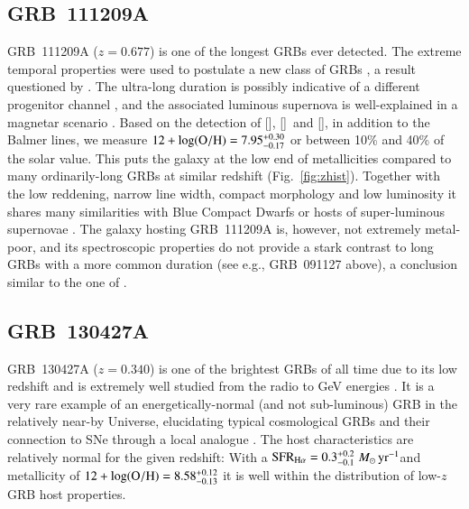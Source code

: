 \documentclass[traditabstract, longauth]{aa}
\newcommand{\oh}{12+\log(\rm{O/H})}
\newcommand{\oii}{[\ion{O}{ii}]}
\newcommand{\oiii}{[\ion{O}{iii}]}
\newcommand{\neiii}{[\ion{Ne}{iii}]}
\newcommand{\Msunyr}{$M_\odot\,\rm{yr}^{-1}$}
\begin{document}
\begin{appendix}
\subsection{GRB~111209A} GRB~111209A ($z=0.677$) is one of the longest GRBs ever detected. The extreme temporal properties were used to postulate a new class of GRBs \citep{2013ApJ...766...30G, 2014ApJ...781...13L}, a result questioned by \citet{2013ApJ...778...54V}. The ultra-long duration is possibly indicative of a different progenitor channel \citep{2013ApJ...778...67N}, and the associated luminous supernova is well-explained in a magnetar scenario \citep{2015Kannsubm, 2015Greinersubm}. Based on the detection of \oii, \oiii\, and \neiii, in addition to the Balmer lines, we measure $\oh=7.95_{-0.17}^{+0.30}$ or between 10\% and 40\% of the solar value. This puts the galaxy at the low end of metallicities compared to many ordinarily-long GRBs at similar redshift (Fig.~\ref{fig:zhist}). Together with the low reddening, narrow line width, compact morphology and low luminosity \citep{2014ApJ...781...13L} it shares many similarities with Blue Compact Dwarfs \citep[e.g.,][and references therein]{2003ApJS..147...29G} or hosts of super-luminous supernovae \citep[e.g.,][]{2014arXiv1409.8331L}. The galaxy hosting GRB~111209A is, however, not extremely metal-poor, and its spectroscopic properties do not provide a stark contrast to long GRBs with a more common duration (see e.g., GRB~091127 above), a conclusion similar to the one of \citet{2014ApJ...781...13L}.

\subsection{GRB~130427A} GRB~130427A ($z=0.340$) is one of the brightest GRBs of all time due to its low redshift and is extremely well studied from the radio to GeV energies \citep[e.g.,][]{2014ApJ...781...37P, 2014Sci...343...42A, 2014MNRAS.444.3151V}. It is a very rare example of an energetically-normal (and not sub-luminous) GRB in the relatively near-by Universe, elucidating typical cosmological GRBs and their connection to SNe through a local analogue \citep{2013ApJ...776...98X, 2014ApJ...792..115L, 2014A&A...567A..29M}. The host characteristics are relatively normal for the given redshift: With a $\rm{SFR}_{\rm{H\alpha}}= 0.3^{+0.2}_{-0.1}\,$\Msunyr and metallicity of $\oh=8.58_{-0.13}^{+0.12}$ it is well within the distribution of low-$z$ GRB host properties.

\end{appendix}
\end{document}
